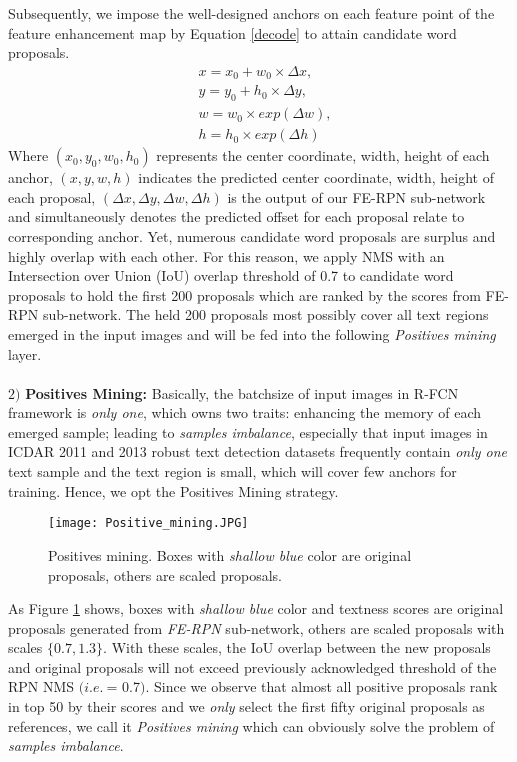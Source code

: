 \documentclass[letterpaper]{article}
\begin{document}
Subsequently, we impose the well-designed anchors on each feature point of the feature enhancement map by Equation \ref{decode} to attain candidate word proposals.
\begin{equation}\label{decode}
\begin{split}
  &x = x_0 + w_0 \times \Delta x, \\
  &y = y_0 + h_0 \times \Delta y, \\
  &w = w_0 \times exp\left(\Delta w \right),\\
  &h = h_0 \times exp\left(\Delta h \right)
\end{split}
\end{equation}
Where $\left(x_0, y_0, w_0, h_0\right)$ represents the center coordinate, width, height of each anchor, $\left(x, y, w, h\right)$ indicates the predicted center coordinate, width, height of each proposal, $\left(\Delta x, \Delta y, \Delta w, \Delta h\right)$ is the output of our FE-RPN sub-network and simultaneously denotes the predicted offset for each proposal relate to corresponding anchor. Yet, numerous candidate word proposals are surplus and highly overlap with each other. For this reason, we apply NMS \cite{neubeck2006efficient} with an Intersection over Union (IoU) overlap threshold of 0.7 to candidate word proposals to hold the first 200 proposals which are ranked by the scores from FE-RPN sub-network. The held 200 proposals most possibly cover all text regions emerged in the input images and will be fed into the following \textit{Positives mining} layer.\\
 \\
$2)$ \textbf{Positives Mining:} Basically, the batchsize of input images in R-FCN \cite{dai2016r} framework is \textit{only one}, which owns two traits: enhancing the memory of each emerged sample; leading to \textit{samples imbalance}, especially that input images in ICDAR 2011 and 2013 robust text detection datasets frequently contain \textit{only one} text sample and the text region is small, which will cover few anchors for training. Hence, we opt the Positives Mining strategy.
\begin{figure}[!htbp]
\begin{center}
\texttt{[image: Positive\_mining.JPG]}
\caption{Positives mining. Boxes with \textit{shallow blue} color are original proposals, others are scaled proposals.}\label{fig:pos}
\end{center}
\end{figure}
\noindent As Figure \ref{fig:pos} shows, boxes with \textit{shallow blue} color and textness scores are original proposals generated from \textit{FE-RPN} sub-network, others are scaled proposals with scales $\{0.7, 1.3\}$. With these scales, the IoU overlap between the new proposals and original proposals will not exceed previously acknowledged threshold of the RPN NMS $(i.e.\ $= 0.7$)$. Since we observe that almost all positive proposals rank in top 50 by their scores and we \textit{only} select the first fifty original proposals as references, we call it \textit{Positives mining} which can obviously solve the problem of \textit{samples imbalance}.
\end{document}
